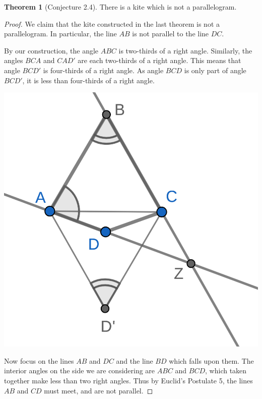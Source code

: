 \documentclass{tufte-handout}
\theoremstyle{definition}
\newtheorem{theorem}{Theorem}[section]
\begin{document}
\begin{theorem}[Conjecture 2.4] \label{theorem:kites-3}
There is a kite which is not a parallelogram.
\end{theorem}

\begin{proof}
We claim that the kite constructed in the last theorem is not a parallelogram. In particular, the line $AB$ is not parallel to the line $DC$.

By our construction, the angle $ABC$ is two-thirds of a right angle. Similarly, the angles $BCA$ and $CAD'$ are each two-thirds of a right angle. This means that angle $BCD'$ is four-thirds of a right angle. As angle $BCD$ is only part of angle $BCD'$, it is less than four-thirds of a right angle.

\begin{marginfigure}
  \includegraphics{images/kite_3.png}
\end{marginfigure}

Now focus on the lines $AB$ and $DC$ and the line $BD$ which falls upon them. The interior angles on the side we are considering are $ABC$ and $BCD$, which taken together make less than two right angles. Thus by Euclid's Postulate 5, the lines $AB$ and $CD$ must meet, and are not parallel.
\end{proof}
\end{document}
